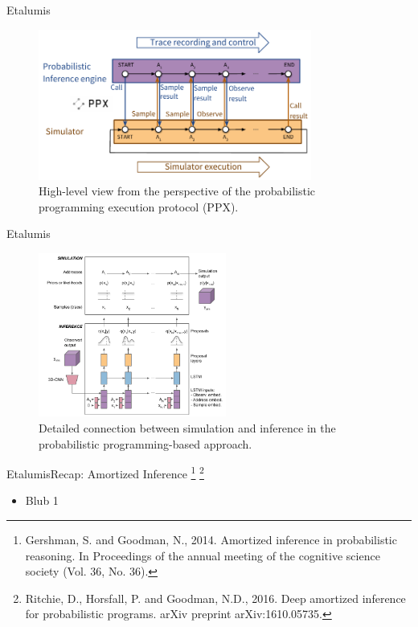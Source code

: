 \documentclass[AERbeamer%
              ,optEnglish%
              ,optBiber%
              ,optBibstyleAlphabetic%
              ,optBeamerClassicFormat%
              ]{AERlatex}%
\begin{document}
\begin{frame}[c]{Etalumis}
    \centering
    \begin{figure}
        \centering
        \includegraphics[width=0.8\textwidth]{PPXTrace.png}
        \caption{High-level view from the perspective of the probabilistic programming execution protocol (PPX).}
    \end{figure}
\end{frame}


\begin{frame}[c]{Etalumis}
    \centering
    \begin{figure}
        \centering
        \includegraphics[width=0.549\textwidth]{ETALUMISSimulationandInference.png}
        \caption{Detailed connection between simulation and inference in the probabilistic programming-based approach.}
    \end{figure}
\end{frame}



\begin{frame}[c]{Etalumis}{Recap: Amortized Inference \footnote{Gershman, S. and Goodman, N., 2014. Amortized inference in
                                                                probabilistic reasoning. In Proceedings of the annual meeting
                                                                of the cognitive science society (Vol. 36, No. 36).}
                                                      \footnote{Ritchie, D., Horsfall, P. and Goodman, N.D., 2016. Deep amortized
                                                                inference for probabilistic programs. arXiv preprint arXiv:1610.05735.}}
    \centering
    \begin{itemize}
        \item Blub 1
    \end{itemize}
\end{frame}
\end{document}
